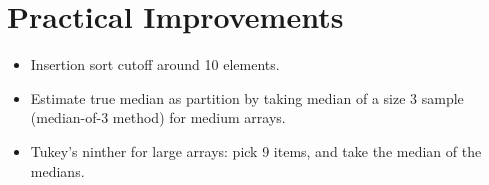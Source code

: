 \documentclass[11pt]{article}
\begin{document}
\section{Practical Improvements}
	\begin{itemize}
		\item Insertion sort cutoff around 10 elements.
		\item Estimate true median as partition by taking median of a size 3 sample (median-of-3 method) for medium arrays.
		\item Tukey's ninther for large arrays: pick 9 items, and take the median of the medians.
	\end{itemize}
\end{document}
